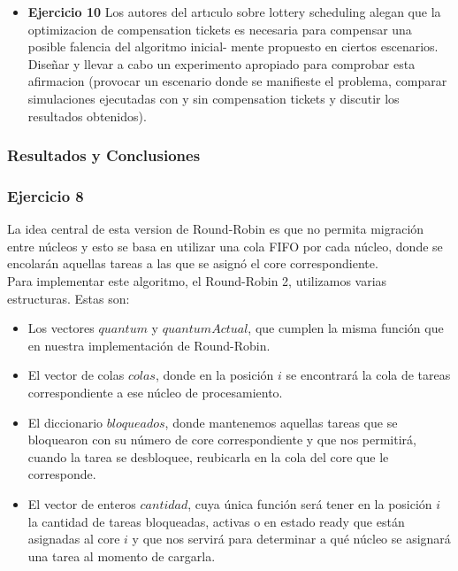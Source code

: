 \begin{itemize}
\item \textbf{Ejercicio 10} Los autores del artıculo sobre lottery scheduling alegan que la optimizacion de
compensation tickets es necesaria para compensar una posible falencia del algoritmo inicial-
mente propuesto en ciertos escenarios. Diseñar y llevar a cabo un experimento apropiado para
comprobar esta afirmacion (provocar un escenario donde se manifieste el problema, comparar
simulaciones ejecutadas con y sin compensation tickets y discutir los resultados obtenidos).

\end{itemize}
\subsubsection{Resultados y Conclusiones}


\subsubsection[]{Ejercicio 8}
\indent \indent La idea central de esta version de Round-Robin es que no permita migración entre núcleos y esto se basa en utilizar una cola FIFO por cada núcleo, donde se encolarán aquellas tareas a las que se asignó el core correspondiente. \\ 
\indent Para implementar este algoritmo, el Round-Robin 2, utilizamos varias estructuras. Estas son:\\
\begin{itemize}
\item Los vectores $quantum$ y $quantumActual$, que cumplen la misma función que en nuestra implementación de Round-Robin.\\
\item El vector de colas $colas$, donde en la posición $i$ se encontrará la cola de tareas correspondiente a ese núcleo de procesamiento.\\
\item El diccionario $bloqueados$, donde mantenemos aquellas tareas que se bloquearon con su número de core correspondiente y que nos permitirá, cuando la tarea se desbloquee, reubicarla en la cola del core que le corresponde.\\ 
\item El vector de enteros $cantidad$, cuya única función será tener en la posición $i$ la cantidad de tareas bloqueadas, activas o en estado ready que están asignadas al core $i$ y que nos servirá para determinar a qué núcleo se asignará una tarea al momento de cargarla.\\
\end{itemize}

